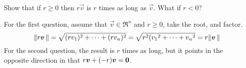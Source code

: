 
\begin{Exercise}[
name={},
title={}, 
difficulty=0,
origin={\cite{JH}}]
    Show that if \( r\geq 0 \) then
     \( r\vec{v} \) is \( r \) times as long
     as \( \vec{v} \).
     What if \( r< 0 \)?
\end{Exercise}

\begin{Answer}
      For the first question, assume that \( \vec{v}\in\Re^n \) and
      \( r\geq 0 \), take the root, and factor.
      \begin{equation*}
        \lVert r\bm{v}\,\rVert
        =\sqrt{(rv_1)^2+\cdots+(rv_n)^2}     
        =\sqrt{r^2({v_1}^2+\cdots+{v_n}^2}     
        =r\lVert\bm{v}\,\rVert
      \end{equation*}
      For the second question, the result is \( r \) times as long, but it
      points in the opposite direction in that
      \( r\bm{v}+(-r)\bm{v}=\bm{0} \). 
\end{Answer}
